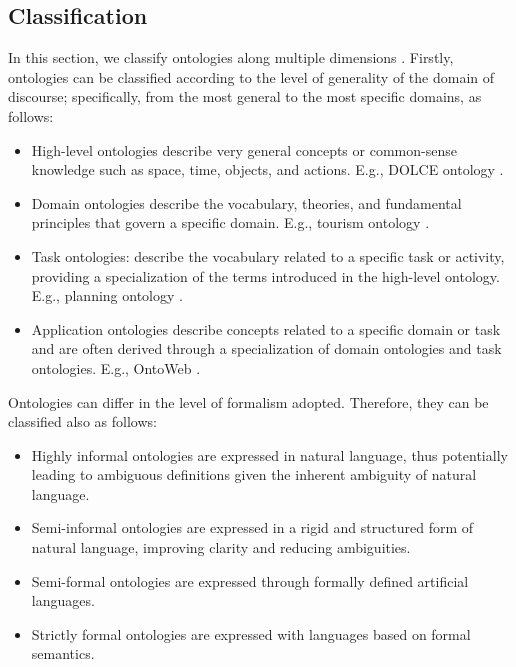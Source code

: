 \subsection{Classification}
In this section, we classify ontologies along multiple dimensions \cite{canfora2004ontologie}.
Firstly, ontologies can be classified according to the level of generality of the domain of discourse; specifically, from the most general to the most specific domains, as follows:
\begin{itemize}
    \item High-level ontologies describe very general concepts or common-sense knowledge such as space, time, objects, and actions. E.g., DOLCE ontology \cite{borgo2022dolce}.
    \item Domain ontologies describe the vocabulary, theories, and fundamental principles that govern a specific domain. E.g., tourism ontology \cite{tourismOntology2013}.
    \item Task ontologies: describe the vocabulary related to a specific task or activity, providing a specialization of the terms introduced in the high-level ontology. E.g., planning ontology \cite{taskOntologyPlanning}.
    \item Application ontologies describe concepts related to a specific domain or task and are often derived through a specialization of domain ontologies and task ontologies. E.g., OntoWeb \cite{ontoweb2002}.
\end{itemize}

Ontologies can differ in the level of formalism adopted. Therefore, they can be classified also as follows:
\begin{itemize}
    \item Highly informal ontologies are expressed in natural language, thus potentially leading to ambiguous definitions given the inherent ambiguity of natural language.
    \item Semi-informal ontologies are expressed in a rigid and structured form of natural language, improving clarity and reducing ambiguities.
    \item Semi-formal ontologies are expressed through formally defined artificial languages.
    \item Strictly formal ontologies are expressed with languages based on formal semantics.
\end{itemize}


